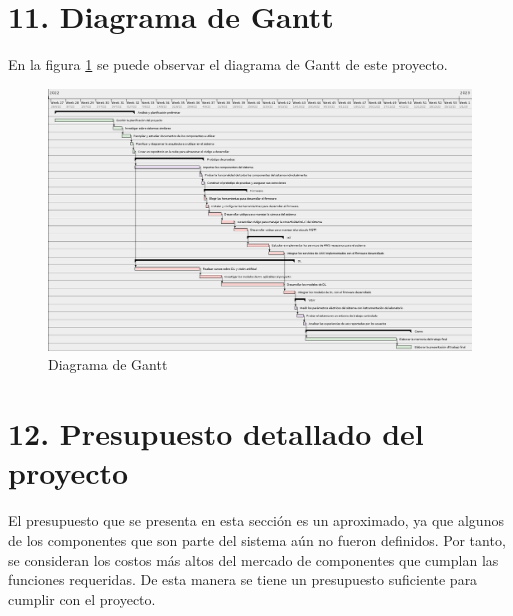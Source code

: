 \documentclass[
11pt, %
]{plan}
\begin{document}
\section{11. Diagrama de Gantt}
\label{sec:gantt}

En la figura \ref{sec:gantt} se puede observar el diagrama de Gantt de este proyecto.

\begin{landscape}
\begin{figure}[htpb]
\centering
\includegraphics[height=.9\textheight]{./fig/gantt.png}
\caption{Diagrama de Gantt}
\label{fig:diagGantt}
\end{figure}

\end{landscape}



\section{12. Presupuesto detallado del proyecto}
\label{sec:presupuesto}

El presupuesto que se presenta en esta sección es un aproximado, ya que algunos de los componentes que son parte del sistema aún no fueron definidos. Por tanto, se consideran los costos más altos del mercado de componentes que cumplan las funciones requeridas. De esta manera se tiene un presupuesto suficiente para cumplir con el proyecto.
\end{document}
